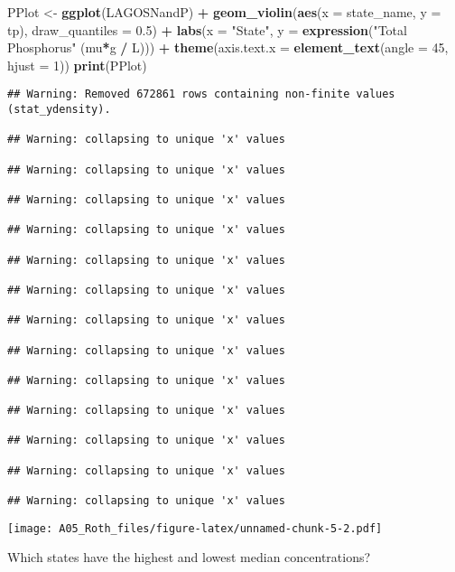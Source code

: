 \documentclass[]{article}
\newenvironment{Shaded}{\begin{snugshade}}{\end{snugshade}}
\newcommand{\DataTypeTok}[1]{\textcolor[rgb]{0.13,0.29,0.53}{#1}}
\newcommand{\DecValTok}[1]{\textcolor[rgb]{0.00,0.00,0.81}{#1}}
\newcommand{\FloatTok}[1]{\textcolor[rgb]{0.00,0.00,0.81}{#1}}
\newcommand{\KeywordTok}[1]{\textcolor[rgb]{0.13,0.29,0.53}{\textbf{#1}}}
\newcommand{\NormalTok}[1]{#1}
\newcommand{\OperatorTok}[1]{\textcolor[rgb]{0.81,0.36,0.00}{\textbf{#1}}}
\newcommand{\StringTok}[1]{\textcolor[rgb]{0.31,0.60,0.02}{#1}}
\begin{document}
\begin{Shaded}
\begin{Highlighting}[]
\NormalTok{PPlot <-}\StringTok{ }\KeywordTok{ggplot}\NormalTok{(LAGOSNandP) }\OperatorTok{+}
\StringTok{  }\KeywordTok{geom_violin}\NormalTok{(}\KeywordTok{aes}\NormalTok{(}\DataTypeTok{x =}\NormalTok{ state_name, }\DataTypeTok{y =}\NormalTok{ tp), }\DataTypeTok{draw_quantiles =} \FloatTok{0.5}\NormalTok{) }\OperatorTok{+}
\StringTok{  }\KeywordTok{labs}\NormalTok{(}\DataTypeTok{x =} \StringTok{"State"}\NormalTok{, }\DataTypeTok{y =}  \KeywordTok{expression}\NormalTok{(}\StringTok{"Total Phosphorus"}\NormalTok{ (mu}\OperatorTok{*}\NormalTok{g }\OperatorTok{/}\StringTok{ }\NormalTok{L))) }\OperatorTok{+}
\StringTok{  }\KeywordTok{theme}\NormalTok{(}\DataTypeTok{axis.text.x =} \KeywordTok{element_text}\NormalTok{(}\DataTypeTok{angle =} \DecValTok{45}\NormalTok{, }\DataTypeTok{hjust =} \DecValTok{1}\NormalTok{))}
\KeywordTok{print}\NormalTok{(PPlot)}
\end{Highlighting}
\end{Shaded}

\begin{verbatim}
## Warning: Removed 672861 rows containing non-finite values (stat_ydensity).

## Warning: collapsing to unique 'x' values

## Warning: collapsing to unique 'x' values

## Warning: collapsing to unique 'x' values

## Warning: collapsing to unique 'x' values

## Warning: collapsing to unique 'x' values

## Warning: collapsing to unique 'x' values

## Warning: collapsing to unique 'x' values

## Warning: collapsing to unique 'x' values

## Warning: collapsing to unique 'x' values

## Warning: collapsing to unique 'x' values

## Warning: collapsing to unique 'x' values

## Warning: collapsing to unique 'x' values

## Warning: collapsing to unique 'x' values
\end{verbatim}

\texttt{[image: A05\_Roth\_files/figure-latex/unnamed-chunk-5-2.pdf]}

Which states have the highest and lowest median concentrations?
\end{document}
